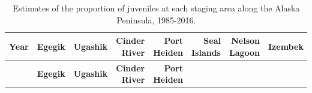 \documentclass[]{article}
\begin{document}
\begin{longtable}[]{@{}rrrrrrrr@{}}
\caption{Estimates of the proportion of juveniles at each staging area
along the Alaska Peninsula, 1985-2016.}\tabularnewline
\toprule
\begin{minipage}[b]{0.08\columnwidth}\raggedleft\strut
\textbf{Year}\strut
\end{minipage} & \begin{minipage}[b]{0.10\columnwidth}\raggedleft\strut
\textbf{Egegik}\strut
\end{minipage} & \begin{minipage}[b]{0.11\columnwidth}\raggedleft\strut
\textbf{Ugashik}\strut
\end{minipage} & \begin{minipage}[b]{0.08\columnwidth}\raggedleft\strut
\textbf{Cinder River}\strut
\end{minipage} & \begin{minipage}[b]{0.14\columnwidth}\raggedleft\strut
\textbf{Port Heiden}\strut
\end{minipage} & \begin{minipage}[b]{0.09\columnwidth}\raggedleft\strut
\textbf{Seal Islands}\strut
\end{minipage} & \begin{minipage}[b]{0.08\columnwidth}\raggedleft\strut
\textbf{Nelson Lagoon}\strut
\end{minipage} & \begin{minipage}[b]{0.10\columnwidth}\raggedleft\strut
\textbf{Izembek}\strut
\end{minipage}\tabularnewline
\midrule
\endfirsthead
\toprule
\begin{minipage}[b]{0.08\columnwidth}\raggedleft\strut
~\strut
\end{minipage} & \begin{minipage}[b]{0.10\columnwidth}\raggedleft\strut
\textbf{Egegik}\strut
\end{minipage} & \begin{minipage}[b]{0.11\columnwidth}\raggedleft\strut
\textbf{Ugashik}\strut
\end{minipage} & \begin{minipage}[b]{0.08\columnwidth}\raggedleft\strut
\textbf{Cinder River}\strut
\end{minipage} & \begin{minipage}[b]{0.14\columnwidth}\raggedleft\strut
\textbf{Port Heiden}\strut
\end{minipage} & \begin{minipage}[b]{0.09\columnwidth}\raggedleft\strut

\end{minipage}
\end{longtable}
\end{document}
